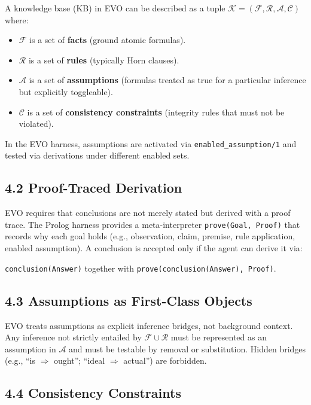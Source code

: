 \documentclass[12pt,a4paper]{article}
\begin{document}
A knowledge base (KB) in EVO can be described as a tuple $\mathcal{K} = (\mathcal{F}, \mathcal{R}, \mathcal{A}, \mathcal{C})$ where:
\begin{itemize}[leftmargin=*,topsep=2pt,itemsep=2pt]
\item $\mathcal{F}$ is a set of \textbf{facts} (ground atomic formulas).
\item $\mathcal{R}$ is a set of \textbf{rules} (typically Horn clauses).
\item $\mathcal{A}$ is a set of \textbf{assumptions} (formulas treated as true for a particular inference but explicitly toggleable).
\item $\mathcal{C}$ is a set of \textbf{consistency constraints} (integrity rules that must not be violated).
\end{itemize}

In the EVO harness, assumptions are activated via \texttt{enabled\_assumption/1} and tested via derivations under different enabled sets.

\subsection{4.2 Proof-Traced Derivation}

EVO requires that conclusions are not merely stated but derived with a proof trace. The Prolog harness provides a meta-interpreter \texttt{prove(Goal, Proof)} that records why each goal holds (e.g., observation, claim, premise, rule application, enabled assumption). A conclusion is accepted only if the agent can derive it via:
\begin{center}
\texttt{conclusion(Answer)} together with \texttt{prove(conclusion(Answer), Proof)}.
\end{center}

\subsection{4.3 Assumptions as First-Class Objects}

EVO treats assumptions as explicit inference bridges, not background context. Any inference not strictly entailed by $\mathcal{F}\cup\mathcal{R}$ must be represented as an assumption in $\mathcal{A}$ and must be testable by removal or substitution. Hidden bridges (e.g., ``is $\Rightarrow$ ought''; ``ideal $\Rightarrow$ actual'') are forbidden.

\subsection{4.4 Consistency Constraints}
\end{document}
